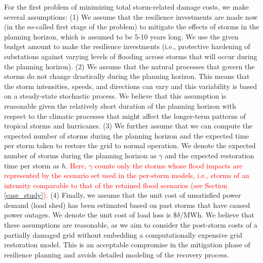 \documentclass[authoryear,preprint,review,12pt]{elsarticle}\usepackage{amssymb}
\begin{document}
For the first problem of minimizing total storm-related damage costs, we make several assumptions: (1) We assume that the resilience investments are made now (in the so-called first stage of the problem) to mitigate the effects of storms in the planning horizon, which is assumed to be 5-10 years long. We use the given budget amount to make the resilience investments (i.e., protective hardening of substations against varying levels of flooding across storms that will occur during the planning horizon). (2) We assume that the natural processes that govern the storms do not change drastically during the planning horizon. This means that the storm intensities, speeds, and directions can vary and this variability is based on a steady-state stochastic process. We believe that this assumption is reasonable given the relatively short duration of the planning horizon with respect to the climatic processes that might affect the longer-term patterns of tropical storms and hurricanes. (3) We further assume that we can compute the expected number of storms during the planning horizon and the expected time per storm taken to restore the grid to normal operation. We denote the expected number of storms during the planning horizon as $\gamma$ and the expected restoration time per storm as $h$. \textcolor{red}{Here, $\gamma$ counts only the storms whose flood impacts are represented by the scenario set used in the per-storm models, i.e., storms of an intensity comparable to that of the retained flood scenarios (see Section \ref{case_study}).} (4) Finally, we assume that the unit cost of unsatisfied power demand (load shed) has been estimated based on past storms that have caused power outages. We denote the unit cost of load loss is $\$\delta$/MWh. We believe that these assumptions are reasonable, as we aim to consider the post-storm costs of a partially damaged grid without embedding a computationally expensive grid restoration model. This is an acceptable compromise in the mitigation phase of resilience planning and avoids detailed modeling of the recovery process. 
\end{document}
